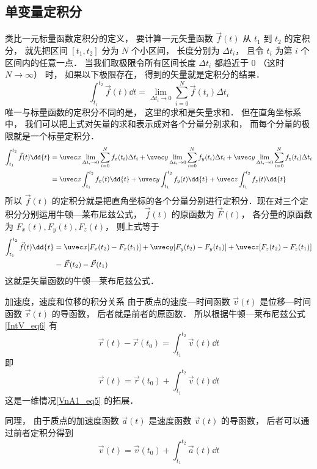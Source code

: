 \subsection{单变量定积分}
类比一元标量函数定积分的定义， 要计算一元矢量函数 $\vec f(t)$ 从 $t_1$ 到 $t_2$ 的定积分， 就先把区间 $[t_1, t_2]$ 分为 $N$ 个小区间， 长度分别为 $\Delta t_i$， 且令 $t_i$ 为第 $i$ 个区间内的任意一点． 当我们取极限令所有区间长度 $\Delta t_i$ 都趋近于 $0$ （这时 $N\to\infty$） 时， 如果以下极限存在， 得到的矢量就是定积分的结果．
\begin{equation}
\int_{t_1}^{t_2} \vec f(t) \dd{t} = \lim_{\Delta t_i \to 0} \sum_{i = 0}^N \vec f(t_i) \Delta t_i
\end{equation}
唯一与标量函数的定积分不同的是， 这里的求和是矢量求和． 但在直角坐标系中， 我们可以把上式对矢量的求和表示成对各个分量分别求和， 而每个分量的极限就是一个标量定积分． 
\begin{equation}\begin{aligned}
\int_{t_1}^{t_2} \vec f(t) \dd{t} &= \uvec x\lim_{\Delta t_i \to 0} \sum_{i = 0}^N f_x(t_i) \Delta t_i
+ \uvec y\lim_{\Delta t_i \to 0} \sum_{i = 0}^N f_y(t_i) \Delta t_i
+ \uvec y\lim_{\Delta t_i \to 0} \sum_{i = 0}^N f_z(t_i) \Delta t_i\\
&= \uvec x\int_{t_1}^{t_2} f_x(t) \dd{t} + \uvec y\int_{t_1}^{t_2} f_y(t) \dd{t} + \uvec z\int_{t_1}^{t_2} f_z(t) \dd{t}
\end{aligned}\end{equation}
所以 $\vec f(t)$ 的定积分就是把直角坐标的各个分量分别进行定积分．现在对三个定积分分别运用牛顿—莱布尼兹公式， $\vec f(t)$ 的原函数为 $\vec F(t)$， 各分量的原函数为 $F_x(t), F_y(t), F_z(t)$， 则上式等于
\begin{equation}\begin{aligned}\label{IntV_eq6}
\int_{t_1}^{t_2} \vec f(t) \dd{t} &= \uvec x [F_x(t_2) - F_x(t_1)] + \uvec y [F_y(t_2) - F_y(t_1)] + \uvec z [F_z(t_2) - F_z(t_1)]\\
&= \vec F(t_2) - \vec F(t_1)
\end{aligned}\end{equation}
这就是矢量函数的牛顿—莱布尼兹公式．

\begin{exam}{加速度，速度和位移的积分关系}\label{IntV_ex1}
由于质点的速度—时间函数 $\vec v(t)$ 是位移—时间函数 $\vec r(t)$ 的导函数， 后者就是前者的原函数． 所以根据牛顿—莱布尼兹公式\autoref{IntV_eq6} 有
\begin{equation}
\vec r(t) - \vec r(t_0) = \int_{t_1}^{t_2} \vec v(t) \dd{t}
\end{equation}
即
\begin{equation}
\vec r(t) = \vec r(t_0) + \int_{t_1}^{t_2} \vec v(t) \dd{t}
\end{equation}
这是一维情况\autoref{VnA1_eq5} 的拓展．

同理， 由于质点的加速度函数 $\vec a(t)$ 是速度函数 $\vec v(t)$ 的导函数， 后者可以通过前者定积分得到
\begin{equation}
\vec v(t) = \vec v(t_0) + \int_{t_1}^{t_2} \vec a(t) \dd{t}
\end{equation}
\end{exam}

